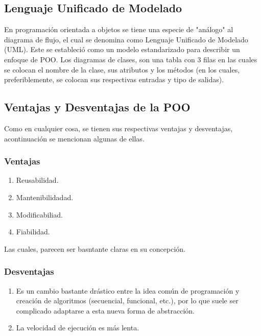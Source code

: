 \subsection{Lenguaje Unificado de Modelado}

En programación orientada a objetos se tiene una especie de "análogo" al diagrama de flujo, el cual se denomina como Lenguaje Unificado de Modelado (UML). Este se estableció como un modelo estandarizado para describir un enfoque de POO. Los diagramas de clases, son una tabla con $3$ filas en las cuales se colocan el nombre de la clase, sus atributos y los métodos (en los cuales, preferiblemente, se colocan sus respectivas entradas y tipo de salidas). 

\subsection{Ventajas y Desventajas de la POO}

Como en cualquier cosa, se tienen sus respectivas ventajas y desventajas, acontinuación se mencionan algunas de ellas.
\subsubsection{Ventajas}
\begin{enumerate}
	\item Reusabilidad.
	\item Mantenibilidadad.
	\item Modificabiliad.
	\item Fiabilidad.
\end{enumerate}


Las cuales, parecen ser basntante claras en su concepción.

\subsubsection{Desventajas}
\begin{enumerate}
	\item Es un cambio bastante drástico entre la idea común de programación y creación de algoritmos (secuencial, funcional, etc.), por lo que suele ser complicado adaptarse a esta nueva forma de abstracción.
	\item La velocidad de ejecución es más lenta.
\end{enumerate}

























